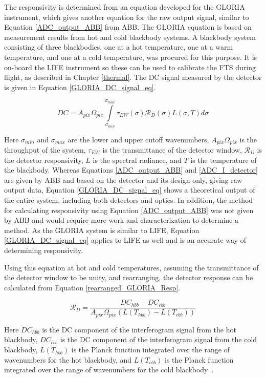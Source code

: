 The responsivity is determined from an equation developed for the GLORIA instrument, which gives another equation for the raw output signal, similar to Equation \ref{ADC_output_ABB} from ABB. The GLORIA equation is based on measurement results from hot and cold blackbody systems. A blackbody system consisting of three blackbodies, one at a hot temperature, one at a warm temperature, and one at a cold temperature, was procured for this purpose. It is on-board the LIFE instrument so these can be used to calibrate the FTS during flight, as described in Chapter \ref{thermal}. The DC signal measured by the detector is given in Equation \ref{GLORIA_DC_signal_eq}.

\begin{equation} \label{GLORIA_DC_signal_eq}
    DC = A_{pix}\Omega_{pix}\int\limits_{\sigma_{min}}^{\sigma_{max}}\tau_{EW}(\sigma)\mathcal{R}_D(\sigma)L(\sigma, T)d\sigma
\end{equation}

Here $\sigma_{min}$ and $\sigma_{max}$ are the lower and upper cutoff wavenumbers, $A_{pix}\Omega_{pix}$ is the throughput of the system, $\tau_{EW}$ is the transmittance of the detector window, $\mathcal{R}_D$ is the detector responsivity, $L$ is the spectral radiance, and $T$ is the temperature of the blackbody. Whereas Equations \ref{ADC_output_ABB} and \ref{ADC_I_detector} are given by ABB and based on the detector and its design only, giving raw output data, Equation \ref{GLORIA_DC_signal_eq} shows a theoretical output of the entire system, including both detectors and optics. In addition, the method for calculating responsivity using Equation \ref{ADC_output_ABB} was not given by ABB and would require more work and characterization to determine a method. As the GLORIA system is similar to LIFE, Equation \ref{GLORIA_DC_signal_eq} applies to LIFE as well and is an accurate way of determining responsivity.

Using this equation at hot and cold temperatures, assuming the transmittance of the detector window to be unity, and rearranging, the detector response can be calculated from Equation \ref{rearranged_GLORIA_Resp}.

\begin{equation} \label{rearranged_GLORIA_Resp}
    \mathcal{R}_D = \frac{DC_{hbb} - DC_{cbb}}{A_{pix}\Omega_{pix}(L(T_{hbb})-L(T_{cbb}))}
\end{equation}

Here $DC_{hbb}$ is the DC component of the interferogram signal from the hot blackbody, $DC_{cbb}$ is the DC component of the interferogram signal from the cold blackbody, $L(T_{hbb})$ is the Planck function integrated over the range of wavenumbers for the hot blackbody, and $L(T_{cbb})$ is the Planck function integrated over the range of wavenumbers for the cold blackbody~\citep{GLORIA_PhD}. 

